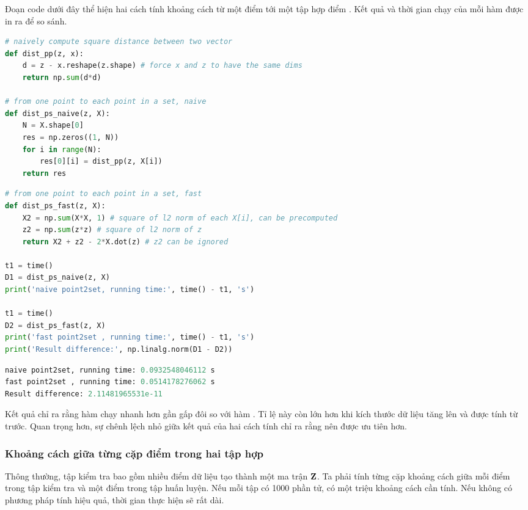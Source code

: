 Đoạn code dưới đây thể hiện hai cách tính khoảng cách từ một điểm
 tới một tập hợp điểm .
Kết quả và thời gian chạy của mỗi hàm được in ra để so sánh.

\begin{lstlisting}[language=Python]
# naively compute square distance between two vector
def dist_pp(z, x):
    d = z - x.reshape(z.shape) # force x and z to have the same dims
    return np.sum(d*d)

# from one point to each point in a set, naive
def dist_ps_naive(z, X):
    N = X.shape[0]
    res = np.zeros((1, N))
    for i in range(N):
        res[0][i] = dist_pp(z, X[i])
    return res
\end{lstlisting}

\newpage
\begin{lstlisting}[language=Python]
# from one point to each point in a set, fast
def dist_ps_fast(z, X):
    X2 = np.sum(X*X, 1) # square of l2 norm of each X[i], can be precomputed
    z2 = np.sum(z*z) # square of l2 norm of z
    return X2 + z2 - 2*X.dot(z) # z2 can be ignored

t1 = time()
D1 = dist_ps_naive(z, X)
print('naive point2set, running time:', time() - t1, 's')

t1 = time()
D2 = dist_ps_fast(z, X)
print('fast point2set , running time:', time() - t1, 's')
print('Result difference:', np.linalg.norm(D1 - D2))
\end{lstlisting}

\kq
\begin{lstlisting}[language=Python]
naive point2set, running time: 0.0932548046112 s
fast point2set , running time: 0.0514178276062 s
Result difference: 2.11481965531e-11
\end{lstlisting}

Kết quả chỉ ra rằng hàm  chạy nhanh hơn gần
gấp đôi so với hàm . Tỉ lệ này còn lớn hơn
khi kích thước dữ liệu tăng lên và  được tính từ trước. Quan trọng hơn, sự chênh lệch nhỏ giữa kết quả của hai cách tính chỉ ra rằng  nên được ưu tiên hơn.

\subsubsection{Khoảng cách giữa từng cặp điểm trong hai tập hợp}
Thông thường, tập kiểm tra bao gồm nhiều điểm dữ liệu tạo thành một ma trận
$\mathbf{Z}$. Ta phải tính từng cặp khoảng cách giữa mỗi điểm trong tập kiểm tra và một
điểm trong tập huấn luyện. Nếu mỗi tập có 1000 phần tử, có một triệu khoảng cách
cần tính. Nếu không có phương pháp tính hiệu quả, thời gian thực hiện sẽ rất dài.

